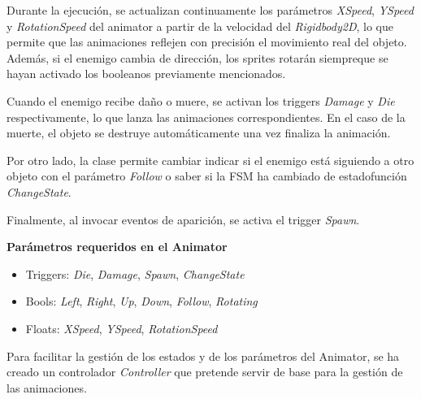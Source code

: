 Durante la ejecución, se actualizan continuamente los parámetros \textit{XSpeed},  \textit{YSpeed}  y  \textit{RotationSpeed}  del animator a partir de la velocidad del \textit{Rigidbody2D}, lo que permite que las animaciones reflejen con precisión el movimiento real del objeto. Además, si el enemigo cambia de dirección, los sprites rotarán siempreque se hayan activado  los booleanos previamente mencionados.

Cuando el enemigo recibe daño o muere, se activan los triggers \textit{Damage} y \textit{Die} respectivamente, lo que lanza las animaciones correspondientes. En el caso de la muerte, el objeto se destruye automáticamente una vez finaliza la animación. 

Por otro lado, la clase permite cambiar indicar si el enemigo está siguiendo a otro objeto con el parámetro \textit{Follow} o saber si la FSM ha cambiado de estadofunción \textit{ChangeState}.

Finalmente, al invocar eventos de aparición, se activa el trigger \textit{Spawn}.

\textbf{Parámetros requeridos en el Animator}
\begin{itemize}
	\item Triggers: \textit{Die}, \textit{Damage}, \textit{Spawn}, \textit{ChangeState}
	\item Bools: \textit{Left}, \textit{Right}, \textit{Up}, \textit{Down}, \textit{Follow}, \textit{Rotating}
	\item Floats: \textit{XSpeed}, \textit{YSpeed}, \textit{RotationSpeed}
\end{itemize}
Para facilitar la gestión de los estados y de los parámetros del Animator, se ha creado un controlador  \textit{Controller} que pretende servir de base para la gestión de las animaciones.


